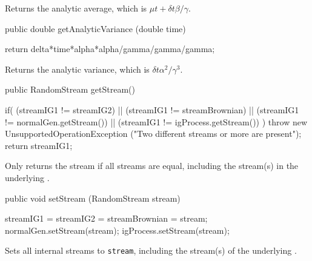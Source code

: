\begin{tabb} Returns the analytic average, which
is $\mu t + \delta t \beta/ \gamma$.
\end{tabb}
\begin{code}

   public double getAnalyticVariance (double time) \begin{hide} {
        return delta*time*alpha*alpha/gamma/gamma/gamma;
    }\end{hide}
\end{code}
\begin{tabb} Returns the analytic variance, which is
$\delta  t  \alpha^2 / \gamma^3$.
\end{tabb}
\begin{code}

   public RandomStream getStream() \begin{hide} {
        if( (streamIG1 != streamIG2)                ||
            (streamIG1 != streamBrownian)         ||
            (streamIG1 != normalGen.getStream())  ||
            (streamIG1 != igProcess.getStream())  )
            throw new UnsupportedOperationException
            ("Two different streams or more are present");
        return streamIG1;
    }\end{hide}
\end{code}
\begin{tabb} Only returns the stream if all streams are equal,
including the stream(s) in the underlying .
\end{tabb}
\begin{code}

   public void setStream (RandomStream stream) \begin{hide} {
        streamIG1 = streamIG2 = streamBrownian = stream;
        normalGen.setStream(stream);
        igProcess.setStream(stream);
    }\end{hide}
\end{code}
\begin{tabb} Sets all internal streams to \texttt{stream},
including the stream(s) of the underlying .
\end{tabb}
\begin{code}
\begin{hide}
} 
\end{hide}
\end{code}
